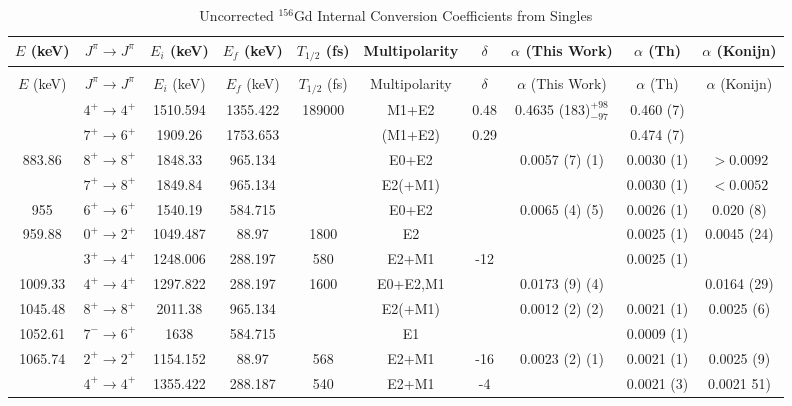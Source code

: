 \begin{landscape}
\small
    \begin{longtable}{c|c|c|c|c|c|c|c|c|c}
    \caption{Uncorrected $^{156}$Gd Internal Conversion Coefficients from Singles}
        \label{tab:156Gd_Single_ICC_Uncorr}\\
    \toprule
$E$ (keV)	&	$J^{\pi}	\rightarrow	J^{\pi}$	&	$E_i$ (keV)	&	$E_f$ (keV)	&	$T_{1/2}$ (fs)	&	Multipolarity	&	$\delta$	&	$\alpha$ (This Work)	&	$\alpha$  (Th)	&	$\alpha$ (Konijn)	\\
\hline		
\endfirsthead
    \caption[]{Uncorrected $^{156}$Gd Internal Conversion Coefficients from Singles}\\
    \toprule
$E$ (keV)	&	$J^{\pi}	\rightarrow	J^{\pi}$	&	$E_i$ (keV)	&	$E_f$ (keV)	&	$T_{1/2}$ (fs)	&	Multipolarity	&	$\delta$	&	$\alpha$ (This Work)	&	$\alpha$  (Th)	&	$\alpha$ (Konijn)	\\
\hline		
\endhead
\endfoot
\endlastfoot
154.94	&	$4^+	\rightarrow	4^+$	&	1510.594	&	1355.422	&	189000	&	M1+E2	&	0.48	&	0.4635 (183)$^{+98}_{-97}$	&	0.460 (7)	& \\
	&	$7^+	\rightarrow	6^+$	&	1909.26	&	1753.653	&		&	(M1+E2)	&	0.29	&		&	0.474 (7)	&		\\ \hline
883.86	&	$8^+	\rightarrow	8^+$	&	1848.33	&	965.134	&		&	E0+E2	&		&	0.0057 (7) (1)	&	0.0030 (1)	& $>0.0092$		\\
	&	$7^+	\rightarrow	8^+$	&	1849.84	&	965.134	&		&	E2(+M1)	&		&		&	0.0030 (1)	&	$<0.0052$	\\ \hline
955	&	$6^+	\rightarrow	6^+$	&	1540.19	&	584.715	&		&	E0+E2	&		&	0.0065 (4) (5)	&	0.0026 (1)	&	0.020 (8)	\\ 
959.88	&	$0^+	\rightarrow	2^+$	&	1049.487	&	88.97	&	1800	&	E2	&		&	&	0.0025 (1)	&	0.0045 (24)	\\
	&	$3^+	\rightarrow	4^+$	&	1248.006	&	288.197	&	580	&	E2+M1	&	-12	&		&	0.0025 (1)	&		\\ \hline
1009.33	&	$4^+	\rightarrow	4^+$	&	1297.822	&	288.197	&	1600	&	E0+E2,M1	&		&	0.0173 (9) (4)	&		&	0.0164 (29)	\\ \hline
1045.48	&	$8^+	\rightarrow	8^+$	&	2011.38	&	965.134	&		&	E2(+M1)	&		&	0.0012 (2) (2)	&	0.0021 (1)	&	0.0025 (6)	\\ 
1052.61	&	$7^-	\rightarrow	6^+$	&	1638	&	584.715	&		&	E1	&		&		&	0.0009 (1)	&		\\ \hline
1065.74	&	$2^+	\rightarrow	2^+$	&	1154.152	&	88.97	&	568	&	E2+M1	&	-16	&	0.0023 (2) (1)	&	0.0021 (1)	&	0.0025 (9)	\\
	&	$4^+	\rightarrow	4^+$	&	1355.422	&	288.187	&	540	&	E2+M1	&	-4	&		&	0.0021 (3)	&	0.0021 51)	\\ \hline

\end{longtable}
\end{landscape}
